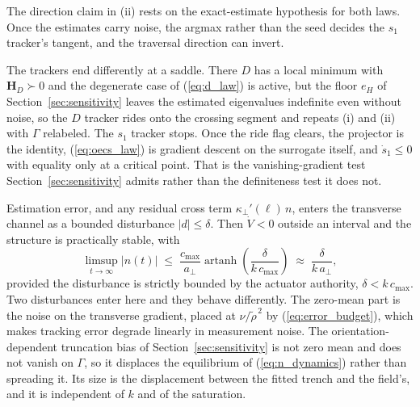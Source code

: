 \documentclass[lettersize,journal]{IEEEtran}
\begin{document}
The direction claim in (ii) rests on the exact-estimate hypothesis for
both laws. Once the estimates carry noise, the argmax rather than the
seed decides the $s_1$ tracker's tangent, and the traversal direction can
invert.

The trackers end differently at a saddle. There $D$ has a local minimum
with $\mathbf{H}_D \succ 0$ and the degenerate case of (\ref{eq:d_law})
is active, but the floor $e_H$ of Section~\ref{sec:sensitivity} leaves the
estimated eigenvalues indefinite even without noise, so the $D$ tracker
rides onto the crossing segment and repeats (i) and (ii) with $\Gamma$
relabeled. The $s_1$ tracker stops. Once the ride flag clears, the
projector is the identity, (\ref{eq:oecs_law}) is gradient descent on
the surrogate itself, and $\dot{s}_1 \leq 0$ with equality only at a
critical point. That is the vanishing-gradient test
Section~\ref{sec:sensitivity} admits rather than the definiteness test it does
not.

Estimation error, and any residual cross term $\kappa_\perp'(\ell)\,n$,
enters the transverse channel as a bounded disturbance $|d| \leq
\delta$. Then $\dot{V} < 0$ outside an interval and the structure is
practically stable, with
\begin{equation}
    \limsup_{t\to\infty}|n(t)| \;\leq\;
    \frac{c_{\max}}{a_\perp}
    \operatorname{artanh}\!\left(\frac{\delta}{k\,c_{\max}}\right)
    \;\approx\; \frac{\delta}{k\,a_\perp},
    \label{eq:iss_bound}
\end{equation}
provided the disturbance is strictly bounded by the actuator authority, $\delta < k\,c_{\max}$. Two disturbances enter here and they behave
differently. The zero-mean part is the noise on the transverse gradient,
placed at $\nu/\tilde{\rho}^{\,2}$ by (\ref{eq:error_budget}), which
makes tracking error degrade linearly in measurement noise. The
orientation-dependent truncation bias of
Section~\ref{sec:sensitivity} is not zero mean and does not vanish on
$\Gamma$, so it displaces the equilibrium of
(\ref{eq:n_dynamics}) rather than spreading it. Its size is the
displacement between the fitted trench and the field's, and it is
independent of $k$ and of the saturation.
\end{document}
